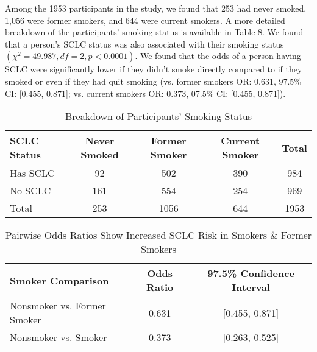 \documentclass{article}
\begin{document}
	Among the 1953 participants in the study, we found that 253 had never smoked, 1,056 were former smokers, and 644 were current smokers. A more detailed breakdown of the participants’ smoking status is available in Table 8. We found that a person’s SCLC status was also associated with their smoking status $(\chi^2 = 49.987, df = 2, p < 0.0001)$. We found that the odds of a person having SCLC were significantly lower if they didn’t smoke directly compared to if they smoked or even if they had quit smoking (vs. former smokers OR: 0.631, 97.5\% CI: [0.455, 0.871]; vs. current smokers OR: 0.373, 07.5\% CI: [0.455, 0.871]).

	\begin{table}[h]
		\centering
		\footnotesize
		\renewcommand{\arraystretch}{1.2}
		\begin{tabular}{l c c c c}
			\toprule
			\textbf{SCLC Status} & \textbf{Never Smoked} & \textbf{Former Smoker} & \textbf{Current Smoker} & \textbf{Total} \\
			\midrule
			Has SCLC & 92 & 502 & 390 & 984 \\
			No SCLC & 161 & 554 & 254 & 969 \\
			\midrule
			Total & 253 & 1056 & 644 & 1953 \\
			\bottomrule
		\end{tabular}
		\caption{Breakdown of Participants’ Smoking Status}
		\label{tab:smoking_status}
	\end{table}
	
	\newpage
	\begin{table}[h]
		\centering
		\footnotesize
		\renewcommand{\arraystretch}{1.2}
		\begin{tabular}{l c c}
			\toprule
			\textbf{Smoker Comparison} & \textbf{Odds Ratio} & \textbf{97.5\% Confidence Interval} \\
			\midrule
			Nonsmoker vs. Former Smoker & 0.631 & [0.455, 0.871] \\
			Nonsmoker vs. Smoker & 0.373 & [0.263, 0.525] \\
			\bottomrule
		\end{tabular}
		\caption{Pairwise Odds Ratios Show Increased SCLC Risk in Smokers \& Former Smokers}
		\label{tab:odds_smoking}
	\end{table}
\end{document}
